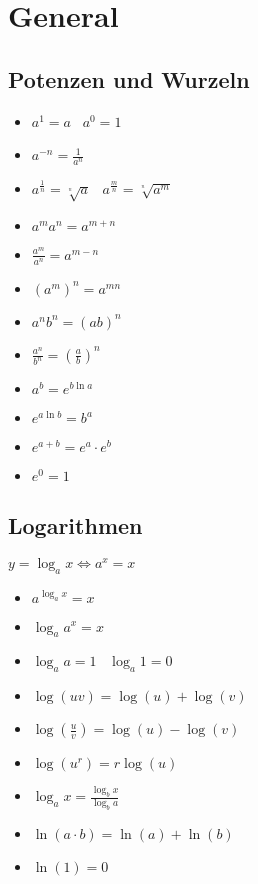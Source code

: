 
\section{General}

\subsection{Potenzen und Wurzeln}
\begin{itemize}
    \item $a^1 = a$ \textbullet\  $a^0 = 1$
    \item $a^{-n} = \frac{1}{a^n}$
    \item $a^{\frac{1}{n}} = \sqrt[^n]{a}$ \textbullet\ $a^{\frac{m}{n}} = \sqrt[^n]{a^m}$
    \item $a^ma^n = a^{m + n}$
    \item $\frac{a^m}{a^n} = a^{m - n}$
    \item $(a^m)^n = a^{m n}$
    \item $a^nb^n = (ab)^n$
    \item $\frac{a^n}{b^n} = \left( \frac{a}{b} \right)^n$
    \item $a^b = e^{b \ln a}$
    \item $e^{a \ln b} = b^a$
    \item $e^{a + b} = e^a \cdot e^b$
    \item $e^0 = 1$
\end{itemize}

\subsection{Logarithmen}
$y = \log_a x \iff a^x = x$
\begin{itemize}
    \item $a^{\log_a x} = x$
    \item $\log_a a^x = x$
    \item $\log_a a = 1$ \textbullet\ $\log_a 1 = 0$
    \item $\log(uv) = \log(u) + \log(v)$
    \item $\log(\frac{u}{v}) = \log(u) - \log(v)$
    \item $\log(u^r) = r \log(u)$
    \item $\log_a x = \frac{\log_b x}{\log_b a}$
    \item $\ln(a \cdot b) = \ln(a) + \ln(b)$
    \item $\ln(1) = 0$
\end{itemize}

